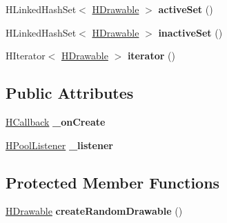 \begin{DoxyCompactItemize}
\item 
\hypertarget{classhype_1_1util_1_1_h_drawable_pool_a8326e4bd816cc062c2ed3f0535b78026}{H\-Linked\-Hash\-Set$<$ \hyperlink{classhype_1_1drawable_1_1_h_drawable}{H\-Drawable} $>$ {\bfseries active\-Set} ()}\label{classhype_1_1util_1_1_h_drawable_pool_a8326e4bd816cc062c2ed3f0535b78026}

\item 
\hypertarget{classhype_1_1util_1_1_h_drawable_pool_a3b6820ee8be2d8416d252f701f41eb3b}{H\-Linked\-Hash\-Set$<$ \hyperlink{classhype_1_1drawable_1_1_h_drawable}{H\-Drawable} $>$ {\bfseries inactive\-Set} ()}\label{classhype_1_1util_1_1_h_drawable_pool_a3b6820ee8be2d8416d252f701f41eb3b}

\item 
\hypertarget{classhype_1_1util_1_1_h_drawable_pool_aa3327f969773d3a77239a955e2ae1274}{H\-Iterator$<$ \hyperlink{classhype_1_1drawable_1_1_h_drawable}{H\-Drawable} $>$ {\bfseries iterator} ()}\label{classhype_1_1util_1_1_h_drawable_pool_aa3327f969773d3a77239a955e2ae1274}

\end{DoxyCompactItemize}
\subsection*{Public Attributes}
\begin{DoxyCompactItemize}
\item 
\hypertarget{classhype_1_1util_1_1_h_drawable_pool_acd09bbc8813c3fab35dd5495ba443873}{\hyperlink{interfacehype_1_1interfaces_1_1_h_callback}{H\-Callback} {\bfseries \-\_\-on\-Create}}\label{classhype_1_1util_1_1_h_drawable_pool_acd09bbc8813c3fab35dd5495ba443873}

\item 
\hypertarget{classhype_1_1util_1_1_h_drawable_pool_af89c46b9354c43572322ecfef05be36d}{\hyperlink{interfacehype_1_1interfaces_1_1_h_pool_listener}{H\-Pool\-Listener} {\bfseries \-\_\-listener}}\label{classhype_1_1util_1_1_h_drawable_pool_af89c46b9354c43572322ecfef05be36d}

\end{DoxyCompactItemize}
\subsection*{Protected Member Functions}
\begin{DoxyCompactItemize}
\item 
\hypertarget{classhype_1_1util_1_1_h_drawable_pool_a7ffe28f86dea669b090082941cfb9a7d}{\hyperlink{classhype_1_1drawable_1_1_h_drawable}{H\-Drawable} {\bfseries create\-Random\-Drawable} ()}\label{classhype_1_1util_1_1_h_drawable_pool_a7ffe28f86dea669b090082941cfb9a7d}

\end{DoxyCompactItemize}
